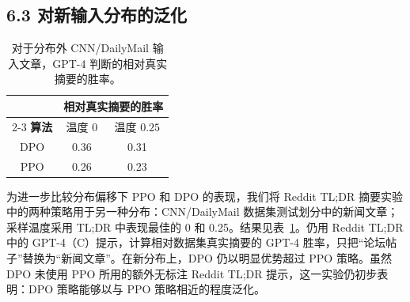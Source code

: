 \subsection*{6.3 对新输入分布的泛化}

\begingroup\setlength{\LTcapwidth}{.97\linewidth}
\begin{longtable}{ccc}
\caption{对于分布外 CNN/DailyMail 输入文章，GPT-4 判断的相对真实摘要的胜率。}\label{dpo-tab:ood}\\

        \toprule
        & \multicolumn{2}{c}{\textbf{相对真实摘要的胜率}} \\
        \cmidrule(lr){2-3}
        \textbf{算法} & 温度 $0$ & 温度 $0.25$ \\
        \midrule
        DPO & 0.36 & 0.31 \\
        PPO & 0.26 & 0.23 \\
        \bottomrule
    
\end{longtable}
\endgroup

为进一步比较分布偏移下 PPO 和 DPO 的表现，我们将 Reddit TL;DR 摘要实验中的两种策略用于另一种分布：CNN/DailyMail 数据集\cite{dpo-nallapati-etal-2016-abstractive}测试划分中的新闻文章；采样温度采用 TL;DR 中表现最佳的 0 和 0.25。结果见表~\ref{dpo-tab:ood}。仍用 Reddit TL;DR 中的 GPT-4（C）提示，计算相对数据集真实摘要的 GPT-4 胜率，只把“论坛帖子”替换为“新闻文章”。在新分布上，DPO 仍以明显优势超过 PPO 策略。虽然 DPO 未使用 PPO 所用的额外无标注 Reddit TL;DR 提示，这一实验仍初步表明：DPO 策略能够以与 PPO 策略相近的程度泛化。

